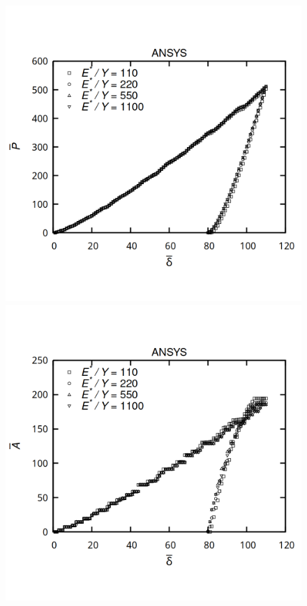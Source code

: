 \documentclass[]{article}
\begin{document}
\begin{figure}[h!]
	\includegraphics[height=0.25\textheight]{pictures/ANSYS_bP_bd.png}
	\includegraphics[height=0.25\textheight]{pictures/ANSYS_bA_bd_low.png}

\end{figure}
\end{document}

